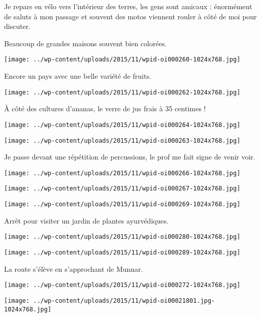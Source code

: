  Je repars en vélo vers l'intérieur des terres, les gens sont amicaux : énormément de saluts à mon passage et souvent des motos viennent rouler à côté de moi pour discuter. 

\pagebreak
 Beaucoup de grandes maisons souvent bien colorées. 
\begin{center} \texttt{[image: ../wp-content/uploads/2015/11/wpid-oi000260-1024x768.jpg]} \end{center}

 Encore un pays avec une belle variété de fruits. 
\begin{center} \texttt{[image: ../wp-content/uploads/2015/11/wpid-oi000262-1024x768.jpg]} \end{center}

\pagebreak
 \`A côté des cultures d'ananas, le verre de jus frais à 35 centimes ! 
\begin{center} \texttt{[image: ../wp-content/uploads/2015/11/wpid-oi000264-1024x768.jpg]} \end{center}
\begin{center} \texttt{[image: ../wp-content/uploads/2015/11/wpid-oi000263-1024x768.jpg]} \end{center}

\pagebreak
 Je passe devant une répétition de percussions, le prof me fait signe de venir voir. 
\begin{center} \texttt{[image: ../wp-content/uploads/2015/11/wpid-oi000266-1024x768.jpg]} \end{center}
\begin{center} \texttt{[image: ../wp-content/uploads/2015/11/wpid-oi000267-1024x768.jpg]} \end{center}
\begin{center} \texttt{[image: ../wp-content/uploads/2015/11/wpid-oi000269-1024x768.jpg]} \end{center}

 Arrêt pour visiter un jardin de plantes ayurvédiques. 
\begin{center} \texttt{[image: ../wp-content/uploads/2015/11/wpid-oi000280-1024x768.jpg]} \end{center}
\begin{center} \texttt{[image: ../wp-content/uploads/2015/11/wpid-oi000289-1024x768.jpg]} \end{center}

 La route s'élève en s'approchant de Munnar. 
\begin{center} \texttt{[image: ../wp-content/uploads/2015/11/wpid-oi000272-1024x768.jpg]} \end{center}
\begin{center} \texttt{[image: ../wp-content/uploads/2015/11/wpid-oi00021801.jpg-1024x768.jpg]} \end{center}

